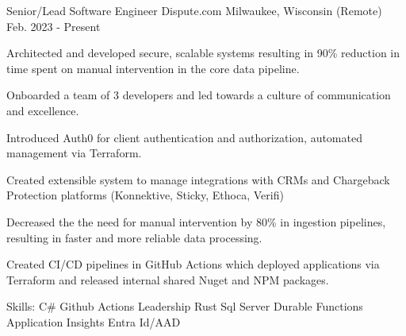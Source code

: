 

\begin{cventries}

  \cventry
    {Senior/Lead Software Engineer} %
    {Dispute.com} %
    {Milwaukee, Wisconsin (Remote)} %
    {Feb. 2023 - Present} %
    {
      \begin{cvitems} %
        \item {Architected and developed secure, scalable systems resulting in 90\% reduction in time spent on 
              manual intervention in the core data pipeline.}
        \item {Onboarded a team of 3 developers and led towards a culture of communication and excellence.}
        \item {Introduced Auth0 for client authentication and authorization, automated management via Terraform.}
        \item {Created extensible system to manage integrations with CRMs and Chargeback Protection platforms (Konnektive, Sticky, Ethoca, Verifi)}
        \item {Decreased the the need for manual intervention by 80\% in ingestion pipelines, resulting in faster and more reliable data processing.}
        \item {Created CI/CD pipelines in GitHub Actions which deployed applications via Terraform and released internal shared Nuget and NPM packages.}
        \item {Skills: C\# \textbullet{} Github Actions \textbullet{} Leadership \textbullet{} Rust \textbullet{} Sql Server \textbullet{} Durable Functions \textbullet{} Application Insights \textbullet{} Entra Id/AAD}
      \end{cvitems}
    }


\end{cventries}
